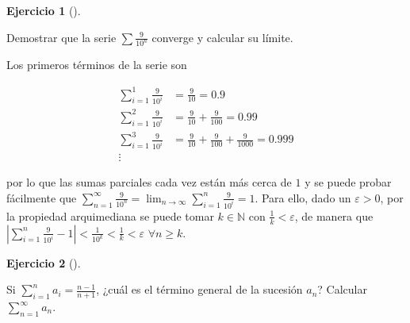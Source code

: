 \documentclass[
  a4paper,
]{scrreport}
\theoremstyle{definition}
\newtheorem{exercise}{Ejercicio}[chapter]
\theoremstyle{remark}
\begin{document}
\begin{exercise}[]\protect\hypertarget{exr-números-decimales-series}{}\label{exr-números-decimales-series}

Demostrar que la serie \(\sum \frac{9}{10^n}\) converge y calcular su
límite.

\end{exercise}

\begin{tcolorbox}[enhanced jigsaw, coltitle=black, toptitle=1mm, colframe=quarto-callout-tip-color-frame, colbacktitle=quarto-callout-tip-color!10!white, breakable, opacityback=0, bottomtitle=1mm, opacitybacktitle=0.6, title=\textcolor{quarto-callout-tip-color}{\faLightbulb}\hspace{0.5em}{Solución}, arc=.35mm, leftrule=.75mm, toprule=.15mm, titlerule=0mm, bottomrule=.15mm, left=2mm, rightrule=.15mm, colback=white]

Los primeros términos de la serie son

\begin{align*}
\sum_{i=1}^1 \frac{9}{10^i} &= \frac{9}{10} = 0.9\\ 
\sum_{i=1}^2 \frac{9}{10^i} &= \frac{9}{10} + \frac{9}{100} = 0.99\\ 
\sum_{i=1}^3 \frac{9}{10^i} &= \frac{9}{10} + \frac{9}{100} + \frac{9}{1000} = 0.999\\ 
\vdots
\end{align*}

por lo que las sumas parciales cada vez están más cerca de \(1\) y se
puede probar fácilmente que
\(\sum_{n=1}^\infty \frac{9}{10^n} = \lim_{n\to\infty} \sum_{i=1}^n \frac{9}{10^i} = 1\).
Para ello, dado un \(\varepsilon>0\), por la propiedad arquimediana se
puede tomar \(k\in\mathbb{N}\) con \(\frac{1}{k}<\varepsilon\), de
manera que
\(|\sum_{i=1}^n \frac{9}{10^i} -1|<\frac{1}{10^k}<\frac{1}{k}<\varepsilon\)
\(\forall n\geq k\).

\end{tcolorbox}

\begin{exercise}[]\protect\hypertarget{exr-sumas-parciales}{}\label{exr-sumas-parciales}

Si \(\sum_{i=1}^n a_i=\frac{n-1}{n+1}\), ¿cuál es el término general de
la sucesión \(a_n\)? Calcular \(\sum_{n=1}^\infty a_n\).

\end{exercise}
\end{document}

